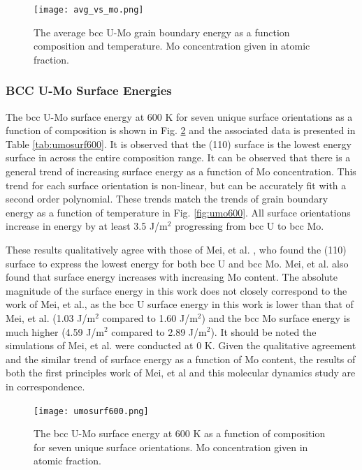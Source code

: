 \documentclass[review]{elsarticle}
\begin{document}
\begin{figure}[h]
 \centering
 \texttt{[image: avg\_vs\_mo.png]} 
 \caption{The average bcc U-Mo grain boundary energy as a function composition and temperature. Mo concentration given in atomic fraction.}
 \label{fig:avgvsmo}
\end{figure}

\FloatBarrier

 
\subsubsection{BCC U-Mo Surface Energies}

The bcc U-Mo surface energy at 600 K for seven unique surface orientations as a function of composition is shown in Fig. \ref{fig:umosurf600} and the associated data is presented in Table \ref{tab:umosurf600}. It is observed that the (110) surface is the lowest energy surface in across the entire composition range. It can be observed that there is a general trend of increasing surface energy as a function of Mo concentration. This trend for each surface orientation is non-linear, but can be accurately fit with a second order polynomial. These trends match the trends of grain boundary energy as a function of temperature in Fig. \ref{fig:umo600}. All surface orientations increase in energy by at least 3.5 J/m$^{2}$ progressing from bcc U to bcc Mo. 

These results qualitatively agree with those of Mei, et al. \cite{zhigang2018}, who found the (110) surface to express the lowest energy for both bcc U and bcc Mo. Mei, et al. also found that surface energy increases with increasing Mo content. The absolute magnitude of the surface energy in this work does not closely correspond to the work of Mei, et al., as the bcc U surface energy in this work is lower than that of Mei, et al. (1.03 J/m$^{2}$ compared to 1.60 J/m$^{2}$) and the bcc Mo surface energy is much higher (4.59 J/m$^{2}$ compared to 2.89 J/m$^{2}$). It should be noted the simulations of Mei, et al. were conducted at 0 K. Given the qualitative agreement and the similar trend of surface energy as a function of Mo content, the results of both the first principles work of Mei, et al \cite{zhigang2018} and this molecular dynamics study are in correspondence.

\begin{figure}[h]
 \centering
 \texttt{[image: umosurf600.png]} 
 \caption{The bcc U-Mo surface energy at 600 K as a function of composition for seven unique surface orientations. Mo concentration given in atomic fraction.}
 \label{fig:umosurf600}
\end{figure}
\end{document}
